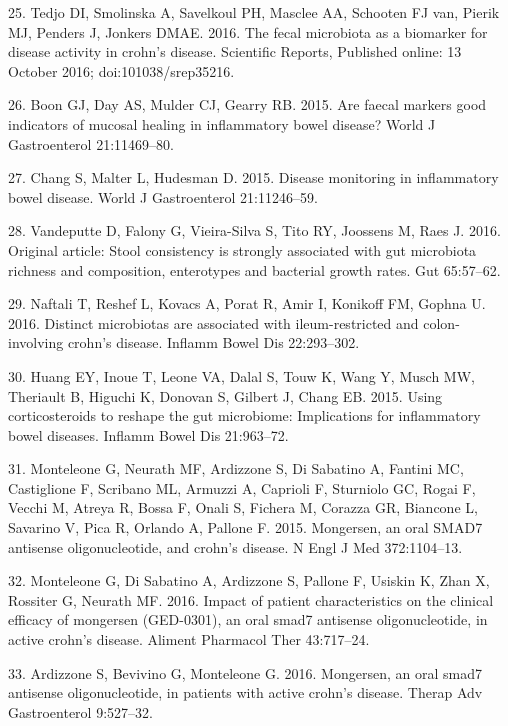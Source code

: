 \documentclass[11pt,]{article}
\begin{document}
\hypertarget{ref-tedjo_CDactivity_2016}{}
25. Tedjo DI, Smolinska A, Savelkoul PH, Masclee AA, Schooten FJ van,
Pierik MJ, Penders J, Jonkers DMAE. 2016. The fecal microbiota as a
biomarker for disease activity in crohn's disease. Scientific Reports,
Published online: 13 October 2016; doi:101038/srep35216.

\hypertarget{ref-boon_fmarkers_2015}{}
26. Boon GJ, Day AS, Mulder CJ, Gearry RB. 2015. Are faecal markers good
indicators of mucosal healing in inflammatory bowel disease? World J
Gastroenterol 21:11469--80.

\hypertarget{ref-chang_monitoring_2015}{}
27. Chang S, Malter L, Hudesman D. 2015. Disease monitoring in
inflammatory bowel disease. World J Gastroenterol 21:11246--59.

\hypertarget{ref-vandeputte_stoolcon_2016}{}
28. Vandeputte D, Falony G, Vieira-Silva S, Tito RY, Joossens M, Raes J.
2016. Original article: Stool consistency is strongly associated with
gut microbiota richness and composition, enterotypes and bacterial
growth rates. Gut 65:57--62.

\hypertarget{ref-naftali_tissinvol_2016}{}
29. Naftali T, Reshef L, Kovacs A, Porat R, Amir I, Konikoff FM, Gophna
U. 2016. Distinct microbiotas are associated with ileum-restricted and
colon-involving crohn's disease. Inflamm Bowel Dis 22:293--302.

\hypertarget{ref-huang_cort_2015}{}
30. Huang EY, Inoue T, Leone VA, Dalal S, Touw K, Wang Y, Musch MW,
Theriault B, Higuchi K, Donovan S, Gilbert J, Chang EB. 2015. Using
corticosteroids to reshape the gut microbiome: Implications for
inflammatory bowel diseases. Inflamm Bowel Dis 21:963--72.

\hypertarget{ref-monteleone_mongersen_2015}{}
31. Monteleone G, Neurath MF, Ardizzone S, Di Sabatino A, Fantini MC,
Castiglione F, Scribano ML, Armuzzi A, Caprioli F, Sturniolo GC, Rogai
F, Vecchi M, Atreya R, Bossa F, Onali S, Fichera M, Corazza GR, Biancone
L, Savarino V, Pica R, Orlando A, Pallone F. 2015. Mongersen, an oral
SMAD7 antisense oligonucleotide, and crohn's disease. N Engl J Med
372:1104--13.

\hypertarget{ref-monteleone_mongersen_2016}{}
32. Monteleone G, Di Sabatino A, Ardizzone S, Pallone F, Usiskin K, Zhan
X, Rossiter G, Neurath MF. 2016. Impact of patient characteristics on
the clinical efficacy of mongersen (GED-0301), an oral smad7 antisense
oligonucleotide, in active crohn's disease. Aliment Pharmacol Ther
43:717--24.

\hypertarget{ref-ardizzone_mongersen_2016}{}
33. Ardizzone S, Bevivino G, Monteleone G. 2016. Mongersen, an oral
smad7 antisense oligonucleotide, in patients with active crohn's
disease. Therap Adv Gastroenterol 9:527--32.
\end{document}
